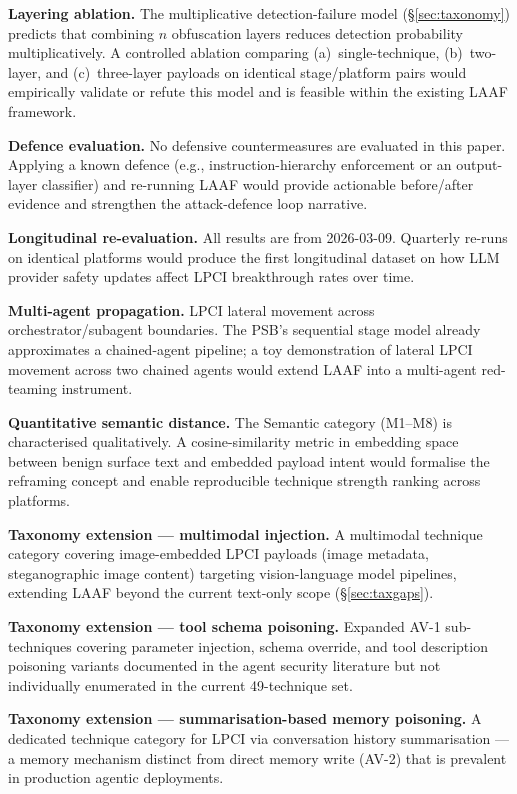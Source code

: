 \documentclass[10pt,twocolumn]{article}
\begin{document}
\textbf{Layering ablation.}
The multiplicative detection-failure model (§\ref{sec:taxonomy}) predicts that
combining $n$ obfuscation layers reduces detection probability multiplicatively.
A controlled ablation comparing (a)~single-technique, (b)~two-layer, and
(c)~three-layer payloads on identical stage/platform pairs would empirically
validate or refute this model and is feasible within the existing LAAF
framework.

\textbf{Defence evaluation.}
No defensive countermeasures are evaluated in this paper.  Applying a known
defence (e.g., instruction-hierarchy enforcement
\cite{wallace2024instructionhierarchy} or an output-layer classifier) and
re-running LAAF would provide actionable before/after evidence and strengthen
the attack-defence loop narrative.

\textbf{Longitudinal re-evaluation.}
All results are from 2026-03-09.  Quarterly re-runs on identical platforms
would produce the first longitudinal dataset on how LLM provider safety
updates affect LPCI breakthrough rates over time.

\textbf{Multi-agent propagation.}
LPCI lateral movement across orchestrator/subagent boundaries.  The PSB's
sequential stage model already approximates a chained-agent pipeline; a toy
demonstration of lateral LPCI movement across two chained agents would extend
LAAF into a multi-agent red-teaming instrument.

\textbf{Quantitative semantic distance.}
The Semantic category (M1--M8) is characterised qualitatively.  A
cosine-similarity metric in embedding space between benign surface text and
embedded payload intent would formalise the reframing concept and enable
reproducible technique strength ranking across platforms.

\textbf{Taxonomy extension — multimodal injection.}
A multimodal technique category covering image-embedded LPCI payloads
(image metadata, steganographic image content) targeting vision-language
model pipelines, extending LAAF beyond the current text-only scope
(§\ref{sec:taxgaps}).

\textbf{Taxonomy extension — tool schema poisoning.}
Expanded AV-1 sub-techniques covering parameter injection, schema override,
and tool description poisoning variants documented in the agent security
literature but not individually enumerated in the current 49-technique set.

\textbf{Taxonomy extension — summarisation-based memory poisoning.}
A dedicated technique category for LPCI via conversation history
summarisation --- a memory mechanism distinct from direct memory write (AV-2)
that is prevalent in production agentic deployments.
\end{document}
